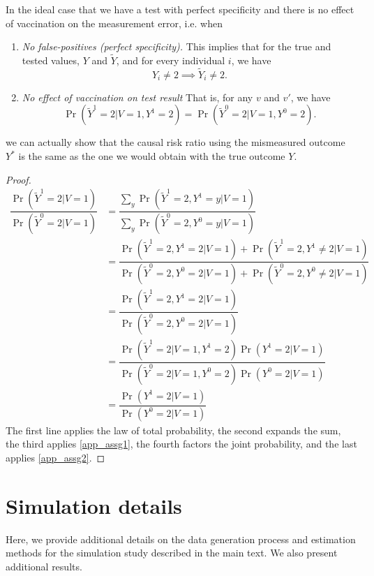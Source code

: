 \begin{appendix}
\begin{refsection}
In the ideal case that we have a test with perfect specificity and there is no effect of vaccination on the measurement error, i.e. when
 \begin{enumerate}[label=\upshape(G\arabic*), ref=G\arabic*]
        \item\label{app_assg1}\textit{No false-positives (perfect specificity).} This implies that for the true and tested values, $Y$ and $\widetilde{Y}$, and for every individual $i$, we have
        \[Y_i \neq 2 \implies \widetilde{Y}_i \neq 2.\]
        \item\label{app_assg2}\textit{No effect of vaccination on test result} That is, for any $v$ and $v'$, we have
         \[\Pr(\widetilde{Y}^{1} = 2 | V = 1, Y^1=2) = \Pr(\widetilde{Y}^{0} = 2 | V = 1, Y^{0}=2).\]
    \end{enumerate}
we can actually show that the causal risk ratio using the mismeasured outcome $Y^*$ is the same as the one we would obtain with the true outcome $Y$. 
\begin{proof}
    \begin{align*}
         \dfrac{\Pr(\widetilde{Y}^{1} = 2 | V = 1)}{\Pr(\widetilde{Y}^0 = 2 | V = 1)} &= \dfrac{\sum_y \Pr(\widetilde{Y}^1 = 2, Y^1 = y | V = 1)}{\sum_y \Pr(\widetilde{Y}^0 = 2, Y^0 = y| V = 1)} \\
        &= \dfrac{\Pr(\widetilde{Y}^1 = 2, Y^1 = 2 | V = 1) + \Pr(\widetilde{Y}^1 = 2, Y^1 \neq 2 | V = 1)}{\Pr(\widetilde{Y}^0 = 2, Y^0 = 2 | V = 1) + \Pr(\widetilde{Y}^0 = 2, Y^0 \neq 2 | V = 1)} \\
        &= \dfrac{\Pr(\widetilde{Y}^1 = 2, Y^1 = 2 | V = 1)}{\Pr(\widetilde{Y}^0 = 2, Y^0 = 2 | V = 1)} \\
        &= \dfrac{\Pr(\widetilde{Y}^1 = 2 | V = 1, Y^1 = 2)\Pr(Y^1 = 2 | V = 1) }{\Pr(\widetilde{Y}^0 = 2 | V = 1, Y^0 = 2) \Pr(Y^0 = 2 | V = 1)} \\
         &= \dfrac{\Pr(Y^1 = 2 | V = 1) }{\Pr(Y^0 = 2 | V = 1) }
    \end{align*}
    The first line applies the law of total probability, the second expands the sum, the third applies \ref{app_assg1}, the fourth factors the joint probability, and the last applies \ref{app_assg2}.
\end{proof}

\newpage

\section{Simulation details}\label{sec:moresim}
Here, we provide additional details on the data generation process and estimation methods for the simulation study described in the main text. We also present additional results. 


\end{refsection}
\end{appendix}

